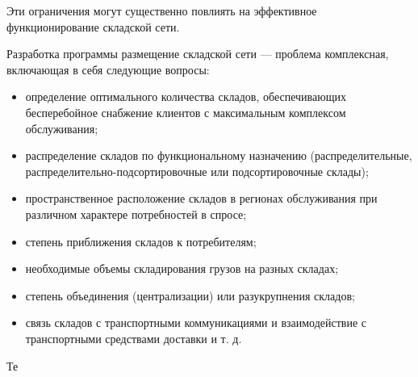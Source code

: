 Эти ограничения могут существенно повлиять на эффективное функционирование складской сети.

Разработка программы размещение складской сети --- проблема комплексная, включающая в себя следующие вопросы:
\begin{itemize}
	\item определение оптимального количества складов, обеспечивающих бесперебойное снабжение клиентов с максимальным комплексом обслуживания;
	\item распределение складов по функциональному назначению (распределительные, распределительно-подсортировочные или подсортировочные склады);
	\item пространственное расположение складов в регионах обслуживания при различном характере потребностей в спросе;
	\item степень приближения складов к потребителям;
	\item необходимые объемы складирования грузов на разных складах;
	\item степень объединения (централизации) или разукрупнения складов;
	\item связь складов с транспортными коммуникациями и взаимодействие с транспортными средствами доставки и т. д.
\end{itemize}

Те